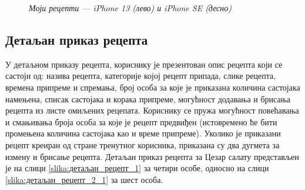 \documentclass[12pt,oneside]{memoir}
\begin{document}
\begin{figure} [H]
    \caption{\textit{Моји рецепти --- iPhone 13 (лево) и iPhone SE (десно)}}
    \label{slika:моји_рецепти_1}
\end{figure}

\subsection{Детаљан приказ рецепта}
\label{subsec:детаљан_рецепт}

\indent У детаљном приказу рецепта, кориснику је презентован опис рецепта који се састоји од: назива рецепта, категорије којој рецепт припада, слике рецепта, времена припреме и спремања, број особа за које је приказана количина састојака намењена, списак састојака и корака припреме, могућност додавања и брисања рецепта из листе омиљених рецепата. Кориснику се пружа могућност повећавања и смањивања броја особа за које је рецепт предвиђен (истовремено ће бити промењена количина састојака као и време припреме). Уколико је приказани рецепт креиран од стране тренутног корисника, приказана су два дугмета за измену и брисање рецепта. Детаљан приказ рецепта за Цезар салату представљен је на слици \ref{slika:детаљан_рецепт_1} за четири особе, односно на слици \ref{slika:детаљан_рецепт_2_1} за шест особа.
\end{document}
